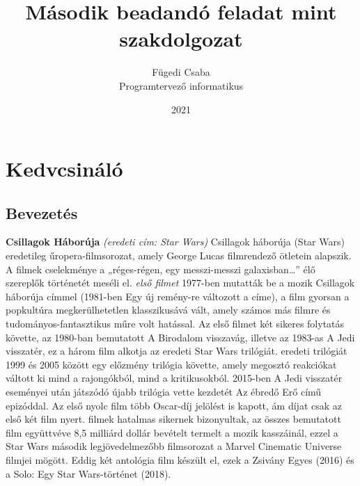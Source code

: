 \documentclass[]{thesis-ekf}
\theoremstyle{definition}
\theoremstyle{remark}
\begin{document}
	\title{Második beadandó feladat mint szakdolgozat}
	\author{Fügedi Csaba\\ Programtervező informatikus}
	\date{2021}
	\maketitle
	\tableofcontents
	\chapter{Kedvcsináló}
	\section{Bevezetés}
	\textbf{Csillagok Háborúja} \textit{(eredeti cím: Star Wars)} \Az Csillagok háborúja (Star Wars) eredetileg űropera-filmsorozat, amely George Lucas filmrendező ötletein alapszik. A filmek cselekménye a „réges-régen, egy messzi-messzi galaxisban…” élő szereplők történetét meséli el. 
	\textit{\Az első filmet} 1977-ben mutatták be a mozik Csillagok háborúja címmel (1981-ben Egy új remény-re változott a címe), a film gyorsan a popkultúra megkerülhetetlen klasszikusává vált, amely számos más filmre és tudományos-fantasztikus műre volt hatással. Az első filmet két sikeres folytatás követte, az 1980-ban bemutatott A Birodalom visszavág, illetve az 1983-as A Jedi visszatér, ez a három film alkotja az eredeti Star Wars trilógiát. \Az eredeti trilógiát 1999 és 2005 között egy előzmény trilógia követte, amely megosztó reakciókat váltott ki mind a rajongókból, mind a kritikusokból. 2015-ben A Jedi visszatér eseményei után játszódó újabb trilógia vette kezdetét Az ébredő Erő című epizóddal. Az első nyolc film több Oscar-díj jelölést is kapott, ám díjat csak az első két film nyert. \Az filmek hatalmas sikernek bizonyultak, az összes bemutatott film együttvéve 8,5 milliárd dollár bevételt termelt a mozik kasszáinál, ezzel a Star Wars második legjövedelmezőbb filmsorozat a Marvel Cinematic Universe filmjei mögött. Eddig két antológia film készült el, ezek a Zsivány Egyes (2016) és a Solo: Egy Star Wars-történet (2018).
	
\end{document}
